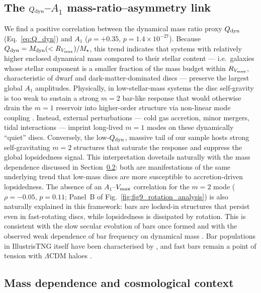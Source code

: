\documentclass[fleqn,usenatbib]{mnras}
\newcommand{\Am}[1]{A_{#1}}
\newcommand{\Amone}{\ensuremath{\Am{1}}}
\begin{document}
\subsection{The $Q_{\rm dyn}$--$\Amone$ mass-ratio--asymmetry link}
\label{sec:astro_stability}

We find a positive correlation between the dynamical mass ratio
proxy $Q_{\rm dyn}$ (Eq.~\ref{eq:Q_dyn}) and
$\Amone$ ($\rho = +0.35$, $p = 1.4 \times 10^{-27}$).  Because
$Q_{\rm dyn} = M_{\rm dyn}(<R_{V_{\rm max}})/M_\star$, this trend
indicates that systems with relatively higher enclosed dynamical
mass compared to their stellar content --- i.e.\ galaxies whose
stellar component is a smaller fraction of the mass budget within
$R_{V_{\rm max}}$, characteristic of dwarf and dark-matter-dominated
discs --- preserve the largest global $\Amone$ amplitudes.
Physically, in low-stellar-mass systems the disc self-gravity is
too weak to sustain a strong $m=2$ bar-like response that would
otherwise drain the $m=1$ reservoir into higher-order structure
via non-linear mode coupling
\citep{1986MNRAS.221..213A,2014RvMP...86....1S}.  Instead, external
perturbations --- cold gas accretion, minor mergers, tidal
interactions --- imprint long-lived $m=1$ modes on these
dynamically ``quiet'' discs.  Conversely, the low-$Q_{\rm dyn}$,
massive tail of our sample hosts strong self-gravitating $m=2$
structures that saturate the response and suppress the global
lopsidedness signal.  This interpretation dovetails naturally with
the mass dependence discussed in
Section~\ref{sec:astro_mass}: both are manifestations of the same
underlying trend that low-mass discs are more susceptible to
accretion-driven lopsidedness.
The absence of an $\Amone$--$V_{\rm max}$ correlation for the
$m = 2$ mode ($\rho = -0.05$, $p = 0.11$; Panel~B of
Fig.~\ref{fig:fig9_rotation_analysis}) is also naturally explained
in this framework: bars are locked-in structures that persist
even in fast-rotating discs, while lopsidedness is dissipated by
rotation.  This is consistent with the slow secular evolution of
bars once formed
\citep{1981A&A....96..164C,1993RPPh...56..173S,2000ApJ...543..704D}
and with the observed weak dependence of bar frequency on
dynamical mass \citep{2018MNRAS.474.5372E}.  Bar populations in
IllustrisTNG itself have been characterised by
\citet{2020MNRAS.491.2547R}, and fast bars remain a point of
tension with $\Lambda$CDM haloes \citep{2021A&A...650L..16F}.


\subsection{Mass dependence and cosmological context}
\label{sec:astro_mass}
\end{document}
